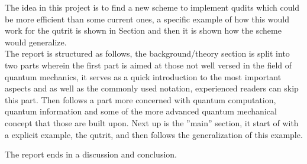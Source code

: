 The idea in this project is to find a new scheme to implement qudits which could be more efficient than some current ones, a specific example of how this would work for the qutrit is shown in Section  and then it is shown how the scheme would generalize.
\\
The report is structured as follows, the background/theory section is split into two parts wherein the first part is aimed at those not well versed in the field of quantum mechanics, it serves as a quick introduction to the most important aspects and as well as the commonly used notation, experienced readers can skip this part. Then follows a part more concerned with quantum computation, quantum information and some of the more advanced quantum mechanical concept that those are built upon.
Next up is the ''main'' section, it start of with a explicit example, the qutrit, and then follows the generalization of this example. 

The report ends in a discussion and conclusion.
